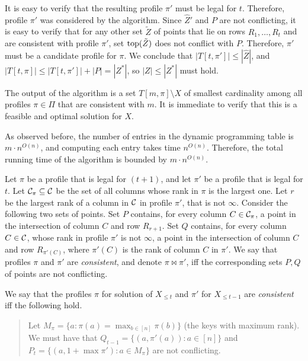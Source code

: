 \documentclass[11pt]{article}
\numberwithin{equation}{section}
\theoremstyle{definition}
\theoremstyle{plain}
\begin{document}
It is easy to verify that the resulting profile $\pi'$ must be legal for $t$. Therefore, profile $\pi'$ was considered by the algorithm. 
Since $\hat Z'$ and $P$ are not conflicting, it is easy to verify that for any other set $\tilde Z$ of points that lie on rows $R_1,\ldots,R_t$ and are consistent with profile $\pi'$, set $\operatorname{top}(\tilde Z)$ does not conflict with $P$. Therefore, $\pi'$ must be a candidate profile for $\pi$. We conclude that $|T[t,\pi']|\leq |\hat Z|$, and  $|T[t,\pi]|\leq |T[t,\pi']|+|P|=|Z^*|$, so $|Z|\leq |Z^*|$ must hold.

The output of the algorithm is a set $T[m,\pi]\setminus X$ of smallest cardinality among all profiles $\pi\in \Pi$ that are consistent with $m$. It is immediate to verify that this is a feasible and optimal solution for $X$.

As observed before, the number of entries in the dynamic programming table is $m\cdot n^{O(n)}$, and computing each entry takes time $n^{O(n)}$. Therefore, the total running time of the algorithm is bounded by $m\cdot n^{O(n)}$.



\iffalse

%

Let $\pi$ be a profile that is legal for $(t+1)$, and let $\pi'$ be a profile that is legal for $t$. 
Let ${\mathcal C}_{\pi}\subseteq {\mathcal C}$ be the set of all columns whose rank in $\pi$ is the largest one.
Let $r$ be the largest rank of a column in ${\mathcal C}$ in profile $\pi'$, that is not $\infty$.
Consider the following two sets of points. Set $P$ contains, for every column $C\in {\mathcal C}_{\pi}$, a point in the intersection of column $C$ and row $R_{r+1}$. Set $Q$ contains, for every column $C\in {\mathcal C}$, whose rank in profile $\pi'$ is not $\infty$, a point in the intersection of column $C$ and row $R_{\pi'(C)}$, where $\pi'(C)$ is the rank of column $C$ in $\pi'$. 
We say that profiles $\pi$ and $\pi'$ are \emph{consistent}, and denote $\pi \bowtie \pi'$, iff the corresponding sets $P,Q$ of points are not conflicting.




%
We say that the profiles $\pi$ for solution of $X_{\leq t}$ and $\pi'$ for $X_{\leq t-1}$ are \emph{consistent} iff the following hold.  



\begin{quote}
Let $M_{\pi} = \{a: \pi(a) = \max_{ b \in [n]} \pi(b)\}$ (the keys with maximum rank). 
We must have that $Q_{t-1}= \{(a, \pi'(a)): a \in [n]\}$ and $P_t= \{(a, 1+\max \pi'): a \in M_{\pi}\}$ are not conflicting. 
%
\end{quote}
\end{document}
